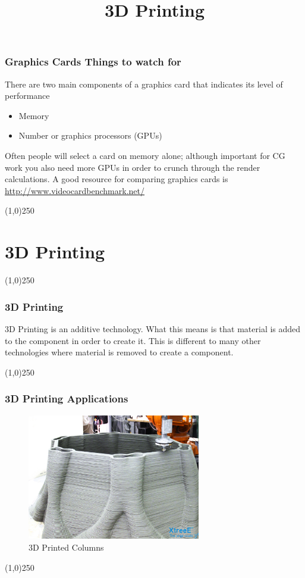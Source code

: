 \begin{frame}
\frametitle{Graphics Cards \hfill\hfill Things to watch for}
There are two main components of a graphics card that indicates its level of performance
\begin{itemize}
	\item Memory
	\item Number or graphics processors (GPUs)
\end{itemize}
Often people will select a card on memory alone; although important for CG work you also need more GPUs in order to crunch through the render calculations.  A good resource for comparing graphics cards is \href{http://www.videocardbenchmark.net/}{http://www.videocardbenchmark.net/}
\end{frame}
\begin{center}\line(1,0){250}\end{center}



\section{3D Printing}
\begin{frame}

\title[3D Printing]{3D Printing}
\titlepage
\end{frame}\begin{center}\line(1,0){250}\end{center}

\begin{frame}
\frametitle{3D Printing}
3D Printing is an additive technology.  What this means is that material is added to the component in order to create it.  This is different to many other technologies where material is removed to create a component.

\end{frame}
\begin{center}\line(1,0){250}\end{center}


\begin{frame}
\frametitle{3D Printing Applications}
\begin{figure}[h]
	\centering
	\includegraphics[height=5.5cm]{img/3DPrinting/3dprintedColumn.jpg}
	\caption[3D Printed Columns]{3D Printed Columns}
	\label{fig:3dprintcolumn}
\end{figure}
\end{frame}
\begin{center}\line(1,0){250}\end{center}


